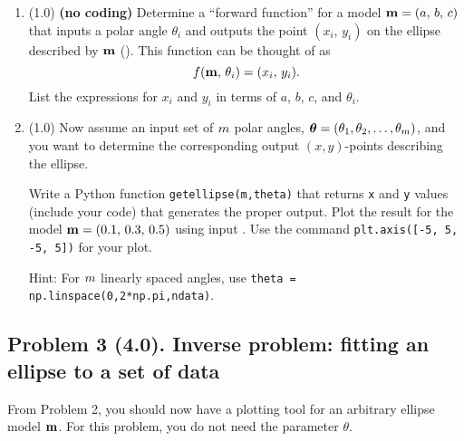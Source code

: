 \documentclass[11pt,titlepage,fleqn]{article}
\begin{document}
\begin{enumerate}
\item (1.0) {\bf (no coding)} Determine a ``forward function'' for a model $\mbox{${\bf m}$} = (a,\,b,\,c)$ that inputs a polar angle $\theta_i$ and outputs the point $(x_i,\,y_i)$ on the ellipse described by $\mbox{${\bf m}$}$ (). This function can be thought of as
%
\begin{equation}
f(\mbox{${\bf m}$},\,\theta_i) = (x_i,\,y_i).
\end{equation}
%
List the expressions for $x_i$ and $y_i$ in terms of $a$, $b$, $c$, and $\theta_i$.

\item (1.0) Now assume an input set of $m$ polar angles, $\mbox{\boldmath $\bf \theta$} = (\theta_1, \theta_2, \ldots, \theta_{m})$, and you want to determine the corresponding output $(x,y)$-points describing the ellipse.

Write a Python function \verb+getellipse(m,theta)+ that returns \verb+x+ and \verb+y+ values (include your code) that generates the proper output. Plot the result for the model $\mbox{${\bf m}$} = (0.1,\,0.3,\,0.5)$ using input . Use the command \verb+plt.axis([-5, 5, -5, 5])+ for your plot.

Hint: For $m$ linearly spaced angles, use \verb+theta = np.linspace(0,2*np.pi,ndata)+.

\end{enumerate}


\pagebreak
\subsection*{Problem 3 (4.0). Inverse problem: fitting an ellipse to a set of data}

From Problem 2, you should now have a plotting tool for an arbitrary ellipse model $\mbox{${\bf m}$}$.
For this problem, you do not need the parameter $\theta$.
\end{document}
